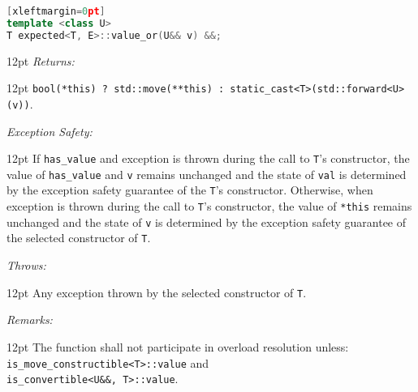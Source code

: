 \documentclass[a4paper,10pt]{article}
\newcommand{\cpp}[1]{\lstinline{#1}}
\newcommand{\wordingItem}[1]{\noindent\textit{#1:}}
\newenvironment{wordingTextItem}[1]{\wordingItem{#1}\vspace{2pt}\noindent\begin{adjustwidth}{12pt}{}}{\vspace{2pt}\end{adjustwidth}}
\newenvironment{wordingPara}{\begin{adjustwidth}{12pt}{}}{\end{adjustwidth}}
\begin{document}
\begin{lstlisting}[language=C++][xleftmargin=0pt]
template <class U>
T expected<T, E>::value_or(U&& v) &&; 
\end{lstlisting}
\begin{wordingPara}
\begin{wordingTextItem}{Returns}
\cpp{bool(*this) ? std::move(**this) : static_cast<T>(std::forward<U>(v))}.
\end{wordingTextItem}
\begin{wordingTextItem}{Exception Safety}
If \cpp{has_value} and exception is thrown during the call to \cpp{T}'s constructor, the value of \cpp{has_value} and \cpp{v} remains unchanged and the state of \cpp{val} is determined by the exception safety guarantee of the \cpp{T}'s constructor. Otherwise, when exception is thrown during the call to \cpp{T}'s constructor, the value of \cpp{*this} remains unchanged and the state of \cpp{v} is determined by the exception safety guarantee of the selected constructor of \cpp{T}.
\end{wordingTextItem}
\begin{wordingTextItem}{Throws}
Any exception thrown by the selected constructor of \cpp{T}.
\end{wordingTextItem}
\begin{wordingTextItem}{Remarks}
The function shall not participate in overload resolution unless: \\
\cpp{is_move_constructible<T>::value} and \\
\cpp{is_convertible<U&&, T>::value}.
\end{wordingTextItem}
\end{wordingPara}
\end{document}
